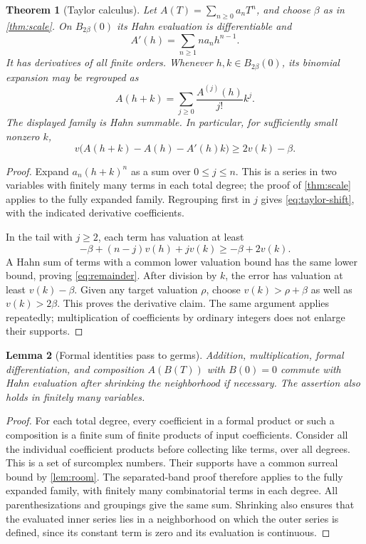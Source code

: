 \documentclass[11pt,a4paper]{article}
\numberwithin{equation}{section}
\newtheorem{theorem}{Theorem}[section]
\newtheorem{lemma}[theorem]{Lemma}
\theoremstyle{definition}
\begin{document}
\begin{theorem}[Taylor calculus]\label{thm:taylor}
Let $A(T)=\sum_{n\geq0}a_nT^n$, and choose $\beta$ as in
\cref{thm:scale}. On $B_{2\beta}(0)$ its Hahn evaluation is differentiable and
\[
 A'(h)=\sum_{n\geq1}na_nh^{n-1}.
\]
It has derivatives of all finite orders. Whenever $h,k\in B_{2\beta}(0)$,
its binomial expansion may be regrouped as
\begin{equation}\label{eq:taylor-shift}
 A(h+k)=\sum_{j\geq0}\frac{A^{(j)}(h)}{j!}k^j.
\end{equation}
The displayed family is Hahn summable. In particular, for sufficiently small
nonzero $k$,
\begin{equation}\label{eq:remainder}
 v\bigl(A(h+k)-A(h)-A'(h)k\bigr)\geq2v(k)-\beta.
\end{equation}
\end{theorem}
\begin{proof}
Expand $a_n(h+k)^n$ as a sum over $0\leq j\leq n$. This is a series in two
variables with finitely many terms in each total degree; the proof of
\cref{thm:scale} applies to the fully expanded family. Regrouping first in $j$
gives \eqref{eq:taylor-shift}, with the indicated derivative coefficients.

In the tail with $j\geq2$, each term has valuation at least
\[
 -\beta+(n-j)v(h)+jv(k)\geq-\beta+2v(k).
\]
A Hahn sum of terms with a common lower valuation bound has the same lower
bound, proving \eqref{eq:remainder}. After division by $k$, the error has
valuation at least $v(k)-\beta$. Given any target valuation $\rho$, choose
$v(k)>\rho+\beta$ as well as $v(k)>2\beta$. This proves the derivative claim.
The same argument applies repeatedly; multiplication of coefficients by
ordinary integers does not enlarge their supports.
\end{proof}

\begin{lemma}[Formal identities pass to germs]\label{lem:formal-eval}
Addition, multiplication, formal differentiation, and composition
$A(B(T))$ with $B(0)=0$ commute with Hahn evaluation after shrinking the
neighborhood if necessary. The assertion also holds in finitely many variables.
\end{lemma}
\begin{proof}
For each total degree, every coefficient in a formal product or such a
composition is a finite sum of finite products of input coefficients.
Consider all the individual coefficient products before collecting like
terms, over all degrees. This is a set of surcomplex numbers. Their supports
have a common surreal bound by \cref{lem:room}. The separated-band proof
therefore applies to the fully expanded family, with finitely many
combinatorial terms in each degree. All parenthesizations and groupings give
the same sum. Shrinking also ensures that the evaluated inner series lies
in a neighborhood on which the outer series is defined, since its constant
term is zero and its evaluation is continuous.
\end{proof}
\end{document}
